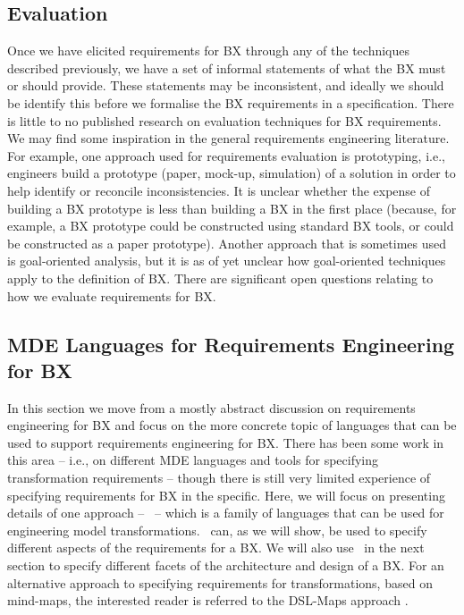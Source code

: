 \subsection{Evaluation}
Once we have elicited requirements for BX through any of the techniques described previously, we have a set of informal statements of what the BX must or should provide. These statements may be inconsistent, and ideally we should be identify this before we formalise the BX requirements in a specification. There is little to no published research on evaluation techniques for BX requirements. We may find some inspiration in the general requirements engineering literature. For example, one approach used for requirements evaluation is prototyping, i.e., engineers build a prototype (paper, mock-up, simulation) of a solution in order to help identify or reconcile inconsistencies. It is unclear whether the expense of building a BX prototype is less than building a BX in the first place (because, for example, a BX prototype could be constructed using standard BX tools, or could be constructed as a paper prototype). Another approach that is sometimes used is goal-oriented analysis, but it is as of yet unclear  how goal-oriented techniques apply to the definition of BX. There are significant open questions relating to how we evaluate requirements for BX.

\subsection{MDE Languages for Requirements Engineering for BX}
In this section we move from a mostly abstract discussion on requirements engineering for BX and focus on the more concrete topic of languages that can be used to support requirements engineering for BX. There has been some work in this area -- i.e., on different MDE languages and tools for specifying transformation requirements -- though there is still very limited experience of specifying requirements for BX in the specific. Here, we will focus on presenting details of one approach -- \transml\ -- which is a family of languages that can be used for engineering model transformations. \transml\ can, as we will show, be used to specify different aspects of the requirements for a BX. We will also use \transml\ in the next section to specify different facets of the architecture and design of a BX. For an alternative approach to specifying requirements for transformations, based on mind-maps, the interested reader is referred to the DSL-Maps approach \cite{PescadorL16}.


